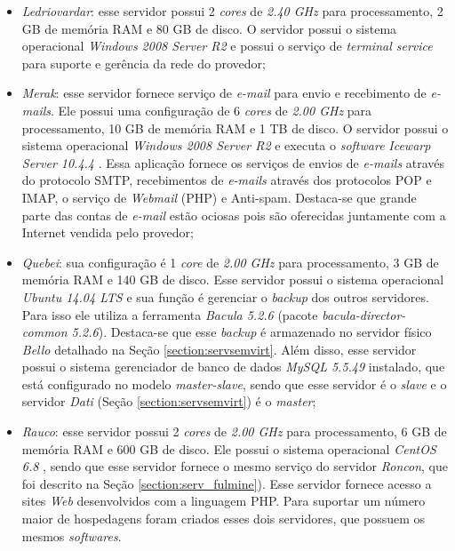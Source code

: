 \begin{itemize}
 \item \textit{Ledriovardar}: esse servidor possui 2 \textit{cores} de \textit{2.40 GHz} para processamento, 2 GB de memória RAM e 80 GB de disco. 
 O servidor possui o sistema operacional \textit{Windows 2008 Server R2} e possui o serviço de \textit{terminal service} para suporte e gerência 
 da rede do provedor;
 
 \item \textit{Merak}: esse servidor fornece serviço de \textit{e-mail} para envio e recebimento de \textit{e-mails}. Ele possui uma configuração 
 de 6 \textit{cores} de \textit{2.00 GHz} para processamento, 10 GB de memória RAM e 1 TB de disco. O servidor possui o sistema operacional 
 \textit{Windows 2008 Server R2} e executa o \textit{software} \textit{Icewarp Server 10.4.4} \cite{icewarp}. Essa aplicação fornece os serviços 
 de envios de \textit{e-mails} através do protocolo \ac{SMTP}, recebimentos de \textit{e-mails} através dos protocolos \ac{POP} e \ac{IMAP}, 
 o serviço de \textit{Webmail} (\ac{PHP}) e Anti-spam. Destaca-se que grande parte das contas de \textit{e-mail} estão ociosas pois são oferecidas 
 juntamente com a Internet vendida pelo provedor;
 
 \item \textit{Quebei}: sua configuração é 1 \textit{core} de \textit{2.00 GHz} para processamento, 3 GB de memória RAM e 140 GB de disco. 
 Esse servidor possui o sistema operacional \textit{Ubuntu 14.04 \ac{LTS}} \cite{ubuntu} e sua função é gerenciar o \textit{backup} dos outros 
 servidores. Para isso ele utiliza a ferramenta \textit{Bacula 5.2.6} \cite{bacula} (pacote \textit{bacula-director-common 5.2.6}). Destaca-se
 que esse \textit{backup} é armazenado no servidor físico \textit{Bello} detalhado na Seção \ref{section:servsemvirt}. Além disso, 
 esse servidor possui o sistema gerenciador de banco de dados \textit{MySQL 5.5.49} \cite{mysql} instalado, que está configurado no modelo 
 \textit{master-slave}, sendo que esse servidor é o \textit{slave} e o servidor \textit{Dati} (Seção \ref{section:servsemvirt}) é o \textit{master};
 
 \item \textit{Rauco}: esse servidor possui 2 \textit{cores} de \textit{2.00 GHz} para processamento, 6 GB de memória RAM e 600 GB de disco. 
 Ele possui o sistema operacional \textit{CentOS 6.8} \cite{centos}, sendo que esse servidor fornece o mesmo serviço do servidor \textit{Roncon}, 
 que foi descrito na Seção \ref{section:serv_fulmine}). Esse servidor fornece acesso a sites \textit{Web} desenvolvidos com a linguagem \ac{PHP}. 
 Para suportar um número maior de hospedagens foram criados esses dois servidores, que possuem os mesmos \textit{softwares}.
\end{itemize}

